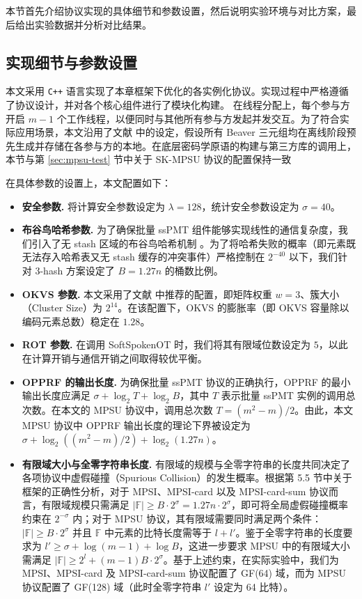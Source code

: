 本节首先介绍协议实现的具体细节和参数设置，然后说明实验环境与对比方案，最后给出实验数据并分析对比结果。

\subsection{实现细节与参数设置}

本文采用 \texttt{C++} 语言实现了本章框架下优化的各实例化协议。实现过程中严格遵循了协议设计，并对各个核心组件进行了模块化构建。
在线程分配上，每个参与方开启 $m-1$ 个工作线程，以便同时与其他所有参与方发起并发交互。为了符合实际应用场景，本文沿用了文献 \cite{ZCLZL-USENIX-2023,LG-ASIACRYPT-2023} 中的设定，假设所有 Beaver 三元组均在离线阶段预先生成并存储在各参与方的本地。在底层密码学原语的构建与第三方库的调用上，本节与第 \ref{sec:mpsu-test} 节中关于 SK-MPSU 协议的配置保持一致

在具体参数的设置上，本文配置如下：

\begin{itemize}
\item \textbf{安全参数.} 将计算安全参数设定为 $\lambda = 128$，统计安全参数设定为 $\sigma = 40$。
\item \textbf{布谷鸟哈希参数.} 为了确保批量 ssPMT 组件能够实现线性的通信复杂度，我们引入了无 stash 区域的布谷鸟哈希机制 \cite{PSTY-EUROCRYPT-2019}。为了将哈希失败的概率（即元素既无法存入哈希表又无 stash 缓存的冲突事件）严格控制在 $2^{-40}$ 以下，我们针对 3-hash 方案设定了 $B = 1.27n$ 的桶数比例。
\item \textbf{OKVS 参数.} 本文采用了文献 \cite{RR-CCS-2022} 中推荐的配置，即矩阵权重 $w = 3$、簇大小（Cluster Size）为 $2^{14}$。在该配置下，OKVS 的膨胀率（即 OKVS 容量除以编码元素总数）稳定在 $1.28$。
\item \textbf{ROT 参数.} 在调用 SoftSpokenOT 时，我们将其有限域位数设定为 $5$，以此在计算开销与通信开销之间取得较优平衡。
\item \textbf{OPPRF 的输出长度.} 为确保批量 ssPMT 协议的正确执行，OPPRF 的最小输出长度应满足 $\sigma + \log_2 T + \log_2 B$，其中 $T$ 表示批量 ssPMT 实例的调用总次数。在本文的 MPSU 协议中，调用总次数 $T = (m^2 - m) / 2$。由此，本文 MPSU 协议中 OPPRF 输出长度的理论下界被设定为 $\sigma + \log_2((m^2 - m) / 2) + \log_2 (1.27n)$。
\item \textbf{有限域大小与全零字符串长度.} 有限域的规模与全零字符串的长度共同决定了各项协议中虚假碰撞（Spurious Collision）的发生概率。根据第 5.5 节中关于框架的正确性分析，对于 MPSI、MPSI-card 以及 MPSI-card-sum 协议而言，有限域规模只需满足 $\lvert \mathbb{F} \rvert \ge B \cdot 2^\sigma = 1.27n \cdot 2^\sigma$，即可将全局虚假碰撞概率约束在 $2^{-\sigma}$ 内；对于 MPSU 协议，其有限域需要同时满足两个条件：$\lvert \mathbb{F} \rvert \ge B \cdot 2^\sigma$ 并且 $\mathbb{F}$ 中元素的比特长度需等于 $l+l'$。鉴于全零字符串的长度要求为 $l' \ge \sigma + \log (m-1) +\log B$，这进一步要求 MPSU 中的有限域大小需满足 $\lvert \mathbb{F} \rvert \ge 2^l + (m-1)B \cdot 2^\sigma$。基于上述约束，在实际实验中，我们为 MPSI、MPSI-card 及 MPSI-card-sum 协议配置了 GF(64) 域，而为 MPSU 协议配置了 GF(128) 域（此时全零字符串 $l'$ 设定为 64 比特）。
\end{itemize}

